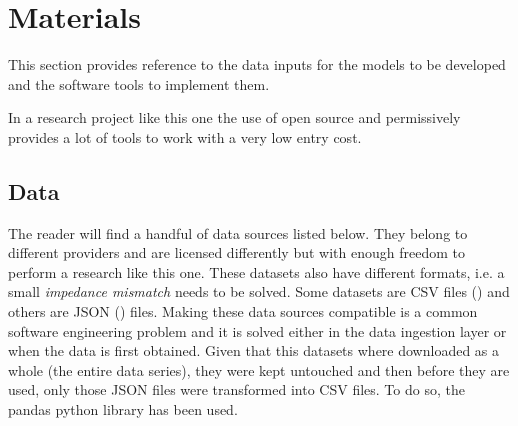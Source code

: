 \section{Materials}
\label{sec:materials}

This section provides reference to the data inputs for the models to be developed and the software tools to implement them.

In a research project like this one the use of open source and permissively provides a lot of tools to work with a very low entry cost.

\subsection{Data}
\label{sec:material_data}

The reader will find a handful of data sources listed below. They belong to different providers and are licensed differently but with enough freedom to perform a research like this one. These datasets also have different formats, i.e. a small \emph{impedance mismatch} needs to be solved. Some datasets are CSV files (\cite{csv}) and others are JSON (\cite{json}) files. Making these data sources compatible is a common software engineering problem and it is solved either in the data ingestion layer or when the data is first obtained. Given that this datasets where downloaded as a whole (the entire data series), they were kept untouched and then before they are used, only those JSON files were transformed into CSV files. To do so, the pandas python library has been used. 